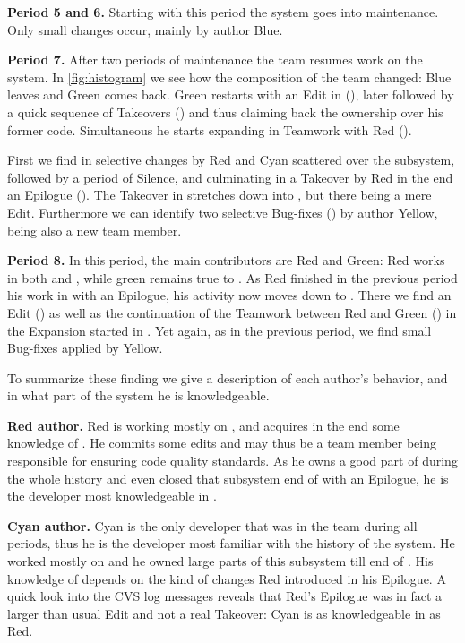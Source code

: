 \textbf{Period 5 and 6.} Starting with this period the system goes into maintenance. Only small changes occur, mainly by author Blue.

\textbf{Period 7.} After two periods of maintenance the team resumes work on the system. In \autoref{fig:histogram} we see how the composition of the team changed: Blue leaves and Green comes back. Green restarts with an Edit in  (), later followed by a quick sequence of Takeovers () and thus claiming back the ownership over his former code. Simultaneous he starts expanding  in Teamwork with Red ().

First we find in  selective changes by Red and Cyan scattered over the subsystem, followed by a period of Silence, and culminating in a Takeover by Red in the end \ie an Epilogue (). The Takeover in  stretches down into , but there being a mere Edit. Furthermore we can identify two selective Bug-fixes () by author Yellow, being also a new team member.

\textbf{Period 8.} In this period, the main contributors are Red and Green: Red works in both  and , while green remains true to . As Red finished in the previous period his work in  with an Epilogue, his activity now moves down to . There we find an Edit () as well as the continuation of the Teamwork between Red and Green () in the Expansion started in . Yet again, as in the previous period, we find small Bug-fixes applied by Yellow.

To summarize these finding we give a description of each author's behavior, and in what part of the system he is knowledgeable.

\textbf{Red author.} Red is working mostly on , and acquires in the end some knowledge of . He commits some edits and may thus be a team member being responsible for ensuring code quality standards. As he owns a good part of  during the whole history and even closed that subsystem end of  with an Epilogue, he is the developer most knowledgeable in .

\textbf{Cyan author.} Cyan is the only developer that was in the team during all periods, thus he is the developer most familiar with the history of the system. He worked mostly on  and he owned large parts of this subsystem till end of . His knowledge of  depends on the kind of changes Red introduced in his Epilogue. A quick look into the CVS log messages reveals that Red's Epilogue was in fact a larger than usual Edit and not a real Takeover: Cyan is as knowledgeable in  as Red.

